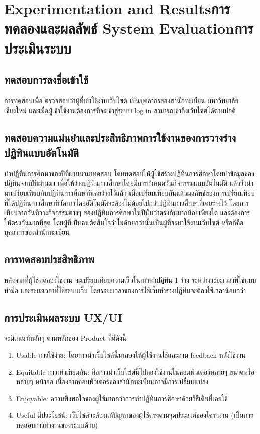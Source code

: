 \chapter{\ifproject%
\ifenglish Experimentation and Results\else การทดลองและผลลัพธ์\fi
\else%
\ifenglish System Evaluation\else การประเมินระบบ\fi
\fi}
\section{ทดสอบการลงชื่อเข้าใช้} 
   การทดสอบเพื่อ ตรวจสอบว่าผู้ที่เข้าใช้งานเว็บไซต์ เป็นบุคลากรของสำนักทะเบียน มหาวิทยาลัยเชียงใหม่ 
และเมื่อผู้เข้าใช้งานต้องการที่จะเข้าสู่ระบบ log in สามารถเข้าถึงเว็บไซต์ได้ตามปกติ

\section{ทดสอบความแม่นยำและประสิทธิภาพการใช้งานของการวางร่างปฏิทินแบบอัตโนมัติ}
   นำปฏิทินการศึกษาของปีที่ผ่านมามาทดสอบ โดยทดสอบให้ผู้ใช้สร้างปฏิทินการศึกษาโดยนำข้อมูลของปฏิทินจากปีที่ผ่านมา 
เพื่อให้ร่างปฏิทินการศึกษาโดยมีการกำหนดวันกิจกรรมแบบอัตโนมัติ แล้วจึงนำมาเปรียบเทียบกับปฏิทินการศึกษาที่เคยร่างไว้แล้ว 
เมื่อเปรียบเทียบกันแล้วผลลัพธ์ของการเปรียบเทียบที่ได้ปฏิทินการศึกษาที่จัดการโดยอัติโนมัติจะต้องไม่ด้อยไปกว่าปฏิทินการศึกษาที่เคยร่างไว้
โดยการเทียบจากวันที่วางกิจกรรมต่างๆ ของปฏิทินการศึกษาในปีนั้นว่าตรงกันมากน้อยเพียงใด และต้องการให้ตรงกันมากที่สุด
โดยผู้ที่เป็นคนตัดสินใจว่าไม่ด้อยกว่านั้นเป็นผู้ที่จะมาใช้งานเว็บไซต์ หรือก็คือบุคลากรของสำนักทะเบียน

\section{การทดสอบประสิทธิภาพ}
หลังจากที่ผู้ใช้ทดลองใช้งาน จะเปรียบเทียบความเร็วในการทำปฏิทิน 1 ร่าง ระหว่างระยะเวลาที่ใช้แบบทำมือ
และระยะเวลาที่ใช้ระบบเว็บ โดยระยะเวลาของการใช้เว็บทำร่างปฏิทินจะต้องใช้เวลาน้อยกว่า

\section{การประเมินผลระบบ UX/UI } 
จะมีเกณฑ์หลักๆ ตามหลักของ Product ที่ดีดังนี้
\begin{enumerate}
   \item Usable การใช้ง่าย: โดยการนำเว็บไซต์นี้มาลองให้ผู้ใช้งานใช้และถาม feedback หลังใช้งาน
   \item Equitable การเท่าเทียมกัน: คือการนำเว็บไซต์นี้ไปลองใช้งานในคอมพิวเตอร์หลายๆ ขนาดหรือหลายๆ หน้าจอ เนื่องจากคอมพิวเตอร์ของสำนักทะเบียนอาจมีการเปลี่ยนแปลง
   \item Enjoyable: ความพึงพอใจของผู้ใช้มากกว่าการทำปฏิทินการศึกษาด้วยวิธีเดิมที่เคยใช้
   \item Useful มีประโยชน์: เว็บไซต์จะต้องแก้ปัญหาของผู้ใช้ตรงตามจุดประสงค์ของโครงงาน (เป็นการทดสอบการทำงานของระบบด้วย)
\end{enumerate}
